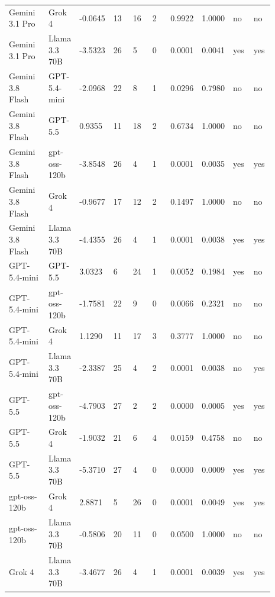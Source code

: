 \begin{landscape}
\begin{longtable}{p{0.162\linewidth}p{0.081\linewidth}p{0.081\linewidth}p{0.081\linewidth}p{0.081\linewidth}p{0.081\linewidth}p{0.081\linewidth}p{0.081\linewidth}p{0.081\linewidth}p{0.081\linewidth}}
Gemini 3.1 Pro & Grok 4 & -0.0645 & 13 & 16 & 2 & 0.9922 & 1.0000 & no & no \\
Gemini 3.1 Pro & Llama 3.3 70B & -3.5323 & 26 & 5 & 0 & 0.0001 & 0.0041 & yes & yes \\
Gemini 3.8 Flash & GPT-5.4-mini & -2.0968 & 22 & 8 & 1 & 0.0296 & 0.7980 & no & no \\
Gemini 3.8 Flash & GPT-5.5 & 0.9355 & 11 & 18 & 2 & 0.6734 & 1.0000 & no & no \\
Gemini 3.8 Flash & gpt-oss-120b & -3.8548 & 26 & 4 & 1 & 0.0001 & 0.0035 & yes & yes \\
Gemini 3.8 Flash & Grok 4 & -0.9677 & 17 & 12 & 2 & 0.1497 & 1.0000 & no & no \\
Gemini 3.8 Flash & Llama 3.3 70B & -4.4355 & 26 & 4 & 1 & 0.0001 & 0.0038 & yes & yes \\
GPT-5.4-mini & GPT-5.5 & 3.0323 & 6 & 24 & 1 & 0.0052 & 0.1984 & yes & no \\
GPT-5.4-mini & gpt-oss-120b & -1.7581 & 22 & 9 & 0 & 0.0066 & 0.2321 & no & no \\
GPT-5.4-mini & Grok 4 & 1.1290 & 11 & 17 & 3 & 0.3777 & 1.0000 & no & no \\
GPT-5.4-mini & Llama 3.3 70B & -2.3387 & 25 & 4 & 2 & 0.0001 & 0.0038 & no & yes \\
GPT-5.5 & gpt-oss-120b & -4.7903 & 27 & 2 & 2 & 0.0000 & 0.0005 & yes & yes \\
GPT-5.5 & Grok 4 & -1.9032 & 21 & 6 & 4 & 0.0159 & 0.4758 & no & no \\
GPT-5.5 & Llama 3.3 70B & -5.3710 & 27 & 4 & 0 & 0.0000 & 0.0009 & yes & yes \\
gpt-oss-120b & Grok 4 & 2.8871 & 5 & 26 & 0 & 0.0001 & 0.0049 & yes & yes \\
gpt-oss-120b & Llama 3.3 70B & -0.5806 & 20 & 11 & 0 & 0.0500 & 1.0000 & no & no \\
Grok 4 & Llama 3.3 70B & -3.4677 & 26 & 4 & 1 & 0.0001 & 0.0039 & yes & yes \\
\bottomrule
\end{longtable}
\normalsize
\end{landscape}

